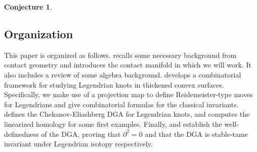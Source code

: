 \documentclass[11pt]{amsart}
\theoremstyle{mystyle}
\newtheorem{conjecture}[conjecture]{Conjecture}
\newcommand{\R}{\mathbb{R}}
\newcommand{\<}{\langle}
\renewcommand{\>}{\rangle}
\begin{document}
\begin{conjecture}
\end{conjecture} %

\subsection{Organization}
This paper is organized as follows.  recalls some necessary background from contact geometry and introduces the contact manifold in which we will work. It also includes a review of some algebra background.  develops a combinatorial framework for studying Legendrian knots in thickened convex surfaces. Specifically, we make use of a projection map to define Reidemeister-type moves for Legendrians and give combinatorial formulas for the classical invariants.  defines the Chekanov-Eliashberg DGA for Legendrian knots, and  computes the linearized homology for some first examples. Finally,  and  establish the well-definedness of the DGA, proving that $\partial^2=0$ and that the DGA is stable-tame invariant under Legendrian isotopy respectively.
\end{document}
